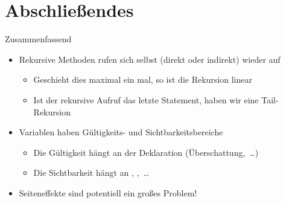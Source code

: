 \section{Abschließendes}
{\SummaryFrame
\begin{frame}[t]{Zusammenfassend}
\pause \printBibCommand
\vfill\vfill %
\begin{itemize}[<+(1)->]
    \itemsep5pt
    \item Rekursive Methoden rufen sich selbst (direkt oder indirekt) wieder auf \begin{itemize}
        \item Geschieht dies maximal ein mal, so ist die Rekursion linear
        \item Ist der rekursive Aufruf das letzte Statement, haben wir eine Tail-Rekursion
    \end{itemize}
    \item Variablen haben Gültigkeits- und Sichtbarkeitsbereiche \begin{itemize}
        \item Die Gültigkeit hängt an der Deklaration (Überschattung,~\ldots)
        \item Die Sichtbarkeit hängt an , ,~\ldots
    \end{itemize}
    \item Seiteneffekte sind potentiell ein großes Problem!
\end{itemize}
\end{frame}
}


\iffull\fi
